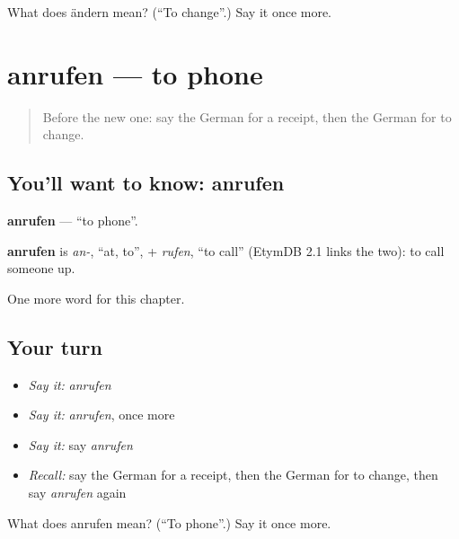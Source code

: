 \begin{tcolorbox}[breakable,colback=teal!4,colframe=teal!35!black,title={Before you move on}]
What does ändern mean? (\textquotedblleft{}To change\textquotedblright{}.) Say it once more.
\end{tcolorbox}
\section[anrufen]{anrufen — to phone}

\label{lesson:GE-C144-anrufen}



\begin{quote}
Before the new one: say the German for a receipt, then the German for to change.
\end{quote}

\subsection*{You'll want to know: anrufen}
\textbf{anrufen} — \textquotedblleft{}to phone\textquotedblright{}.

\begin{cousinweb}
\textbf{anrufen} is \emph{an-}, \textquotedblleft{}at, to\textquotedblright{}, + \emph{rufen}, \textquotedblleft{}to call\textquotedblright{} (EtymDB 2.1 links the two): to call someone up.
\end{cousinweb}

\begin{grammarlens}[title={What you've built}]
One more word for this chapter.
\end{grammarlens}

\subsection*{Your turn}
\begin{itemize}
\raggedright
  \item \emph{Say it:} \emph{anrufen}
  \item \emph{Say it:} \emph{anrufen}, once more
  \item \emph{Say it:} say \emph{anrufen}
  \item \emph{Recall:} say the German for a receipt, then the German for to change, then say \emph{anrufen} again
\end{itemize}

\begin{tcolorbox}[breakable,colback=teal!4,colframe=teal!35!black,title={Before you move on}]
What does anrufen mean? (\textquotedblleft{}To phone\textquotedblright{}.) Say it once more.
\end{tcolorbox}
